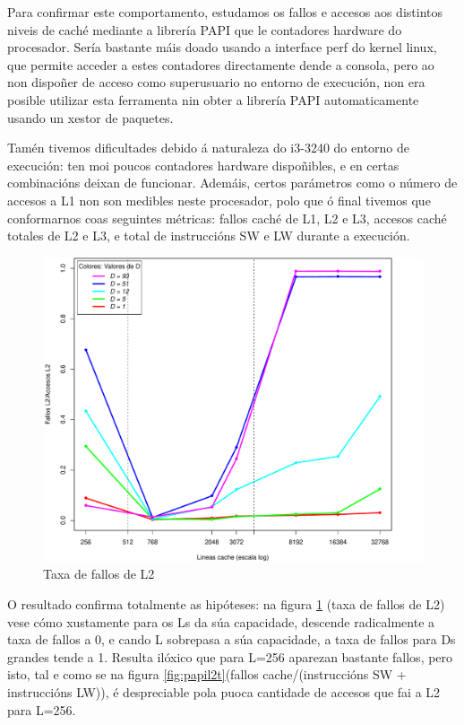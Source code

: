 \documentclass[letterpaper, 10 pt,spanish, conference]{ieeeconf}  %
\begin{document}
Para confirmar este comportamento, estudamos os fallos e accesos aos distintos niveis de caché mediante a librería PAPI que le contadores hardware do procesador. Sería bastante máis doado usando a interface perf do kernel linux, que permite acceder a estes contadores directamente dende a consola, pero ao non dispoñer de acceso como superusuario no entorno de execución, non era posible utilizar esta ferramenta nin obter a librería PAPI automaticamente usando un xestor de paquetes.

Tamén tivemos dificultades debido á naturaleza do i3-3240 do entorno de execución: ten moi poucos contadores hardware dispoñibles, e en certas combinacións deixan de funcionar. Ademáis, certos parámetros como o número de accesos a L1 non son medibles neste procesador, polo que ó final tivemos que conformarnos coas seguintes métricas: fallos caché de L1, L2 e L3, accesos caché totales de L2 e L3, e total de instruccións SW e LW durante a execución.

\begin{figure}
    \centering
    \includegraphics[scale=0.38]{L2M-L2A.pdf}
    \caption{Taxa de fallos de L2}
    \label{fig:papil2}
\end{figure}

O resultado confirma totalmente as hipóteses: na figura \ref{fig:papil2} (taxa de fallos de L2) vese cómo xustamente para os Ls da súa capacidade, descende radicalmente a taxa de fallos a 0, e cando L sobrepasa a súa capacidade, a taxa de fallos para Ds grandes tende a 1. Resulta ilóxico que para L=256 aparezan bastante fallos, pero isto, tal e como se na figura \ref{fig:papil2t}(fallos cache/(instruccións SW + instruccións LW)), é despreciable pola puoca cantidade de accesos que fai a L2 para L=256.  
\end{document}
